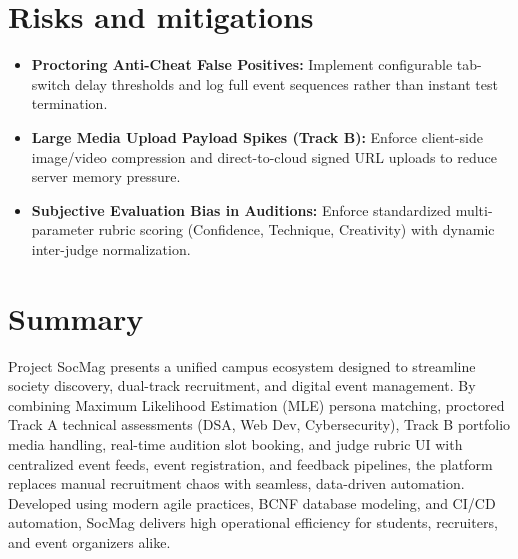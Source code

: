 \documentclass[11pt,a4paper]{article}
\begin{document}
\section{Risks and mitigations}
\begin{itemize}[leftmargin=0.7cm]
    \item \textbf{Proctoring Anti-Cheat False Positives:} Implement configurable tab-switch delay thresholds and log full event sequences rather than instant test termination.
    \item \textbf{Large Media Upload Payload Spikes (Track B):} Enforce client-side image/video compression and direct-to-cloud signed URL uploads to reduce server memory pressure.
    \item \textbf{Subjective Evaluation Bias in Auditions:} Enforce standardized multi-parameter rubric scoring (Confidence, Technique, Creativity) with dynamic inter-judge normalization.
\end{itemize}

\section{Summary}
Project SocMag presents a unified campus ecosystem designed to streamline society discovery, dual-track recruitment, and digital event management. By combining Maximum Likelihood Estimation (MLE) persona matching, proctored Track A technical assessments (DSA, Web Dev, Cybersecurity), Track B portfolio media handling, real-time audition slot booking, and judge rubric UI with centralized event feeds, event registration, and feedback pipelines, the platform replaces manual recruitment chaos with seamless, data-driven automation. Developed using modern agile practices, BCNF database modeling, and CI/CD automation, SocMag delivers high operational efficiency for students, recruiters, and event organizers alike.
\end{document}

